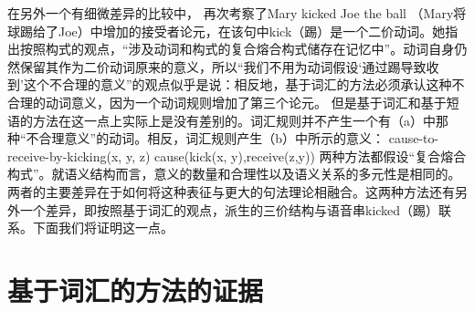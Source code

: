     在另外一个有细微差异的比较中， \citet[--140]{Goldberg95a}再次考察了Mary kicked Joe the ball （Mary将球踢给了Joe）中增加的接受者论元，在该句中kick（踢）是一个二价动词。她指出按照构式的观点，“涉及动词和构式的复合熔合构式储存在记忆中”。动词自身仍然保留其作为二价动词原来的意义，所以“我们不用为动词假设‘通过踢导致收到’这个不合理的意义”的观点似乎是说：相反地，基于词汇的方法必须承认这种不合理的动词意义，因为一个动词规则增加了第三个论元。
    但是基于词汇和基于短语的方法在这一点上实际上是没有差别的。词汇规则并不产生一个有（a）中那种“不合理意义”的动词。相反，词汇规则产生（b）中所示的意义：
\eal
\ex cause-to-receive-by-kicking(x, y, z) 
\ex cause(kick(x, y),receive(z,y))
\zl
两种方法都假设“复合熔合构式”。就语义结构而言，意义的数量和合理性以及语义关系的多元性是相同的。两者的主要差异在于如何将这种表征与更大的句法理论相融合。这两种方法还有另外一个差异，即按照基于词汇的观点，派生的三价结构与语音串kicked（踢）联系。下面我们将证明这一点。
 
\section{基于词汇的方法的证据}
